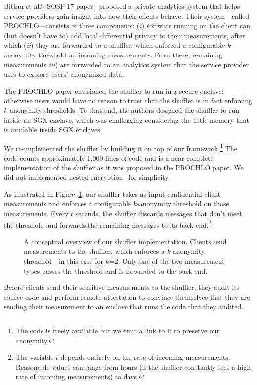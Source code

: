 Bittau et al.'s SOSP'17 paper~\cite{Bittau2017a} proposed a private analytics system that helps service providers gain insight into how their clients behave.  Their system---called PROCHLO---consists of three components: (\emph{i}) software running on the client can (but doesn't have to) add local differential privacy to their measurements, after which (\emph{ii}) they are forwarded to a shuffler, which enforced a configurable $k$-anonymity threshold on incoming measurements. From there, remaining measurements \emph{iii}) are forwarded to an analytics system that the service provider uses to explore users' anonymized data.

The PROCHLO paper envisioned the shuffler to run in a secure enclave; otherwise users would have no reason to trust that the shuffler is in fact enforcing $k$-anonymity thresholds.  To that end, the authors designed the shuffler to run inside an SGX enclave, which was challenging considering the little memory that is available inside SGX enclaves.

We re-implemented the shuffler by building it on top of our framework.\footnote{The code is freely available but we omit a link to it to preserve our anonymity.}  The code counts approximately 1,000 lines of code and is a near-complete implementation of the shuffler as it was proposed in the PROCHLO paper.  We did not implemented nested encryption~\cite[\S~3]{Bittau2017a} for simplicity.

As illustrated in Figure~\ref{fig:shuffler}, our shuffler takes as input confidential client measurements and enforces a configurable $k$-anonymity threshold on those measurements.  Every $t$ seconds, the shuffler discards messages that don't meet the threshold and forwards the remaining messages to its back end.\footnote{The variable $t$ depends entirely on the rate of incoming measurements.  Reasonable values can range from hours (if the shuffler constantly sees a high rate of incoming measurements) to days.}

\begin{figure}[t]
\centering

\caption{A conceptual overview of our shuffler implementation.  Clients send measurements to the shuffler, which enforces a $k$-anonymity threshold---in this case for $k$=2. Only one of the two measurement types passes the threshold and is forwarded to the back end.}
\label{fig:shuffler}
\end{figure}

Before clients send their sensitive measurements to the shuffler, they audit its source code and perform remote attestation to convince themselves that they are sending their measurement to an enclave that runs the code that they audited.

